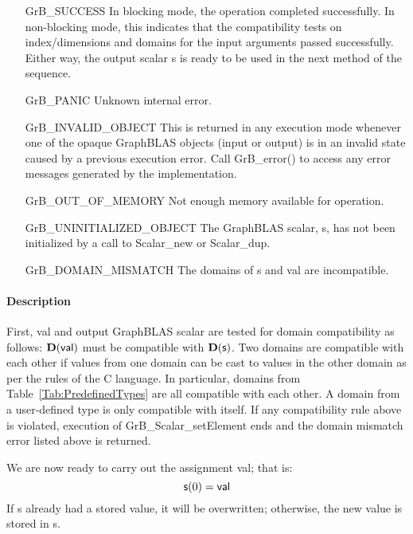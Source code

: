 \begin{itemize}[leftmargin=2.1in]
    \item[{\sf GrB\_SUCCESS}]         In blocking mode, the operation completed
    successfully. In non-blocking mode, this indicates that the compatibility 
    tests on index/dimensions and domains for the input arguments passed successfully. 
    Either way, the output scalar {\sf s} is ready to be used in the next method of 
    the sequence.

    \item[{\sf GrB\_PANIC}]   Unknown internal error.
    
    \item[{\sf GrB\_INVALID\_OBJECT}] This is returned in any execution mode 
    whenever one of the opaque GraphBLAS objects (input or output) is in an invalid 
    state caused by a previous execution error.  Call {\sf GrB\_error()} to access 
    any error messages generated by the implementation.

    \item[{\sf GrB\_OUT\_OF\_MEMORY}]  Not enough memory available for operation.
    
    \item[{\sf GrB\_UNINITIALIZED\_OBJECT}]  The GraphBLAS scalar, {\sf s}, has 
    not been initialized by a call to {\sf Scalar\_new} or {\sf Scalar\_dup}.
    
    \item[{\sf GrB\_DOMAIN\_MISMATCH}]     The domains of {\sf s} and {\sf val}
    are incompatible.
\end{itemize}

\paragraph{Description}

First, {\sf val} and output GraphBLAS scalar are tested for domain compatibility as follows:
$\mathbf{D}({\sf val})$ must be compatible with $\mathbf{D}({\sf s})$. Two domains 
are compatible with each other if values from one domain can be cast to values 
in the other domain as per the rules of the C language. In particular, domains 
from Table~\ref{Tab:PredefinedTypes} are all compatible with each other. A domain 
from a user-defined type is only compatible with itself. If any compatibility 
rule above is violated, execution of {\sf GrB\_Scalar\_setElement} ends and 
the domain mismatch error listed above is returned.

We are now ready to carry out the assignment {\sf val}; that is:
\[
    {\sf s}(0) = {\sf val}
\]
If {\sf s} already had a stored value, it will be overwritten; otherwise,
the new value is stored in {\sf s}.

